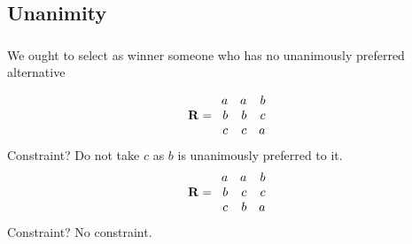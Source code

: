 \documentclass[french,english]{beamer}
\begin{document}
\subsection{Unanimity}
\begin{frame}
	\frametitle{\subsecname}
	\begin{definition}[Unanimity]
		We ought to select as winner someone who has no unanimously preferred alternative
	\end{definition}
	\begin{equation}
		\mathbf{R} =
		\begin{array}{rrr}
			a	&	a	&	b\\
			b	&	b	&	c\\
			c	&	c	&	a
		\end{array}
	\end{equation}
	Constraint? \pause Do not take $c$ as $b$ is unanimously preferred to it.	\pause
	\begin{equation}
		\mathbf{R} =
		\begin{array}{rrr}
			a	&	a	&	b\\
			b	&	c	&	c\\
			c	&	b	&	a
		\end{array}
	\end{equation}
	Constraint? \pause No constraint.
\end{frame}
\end{document}
